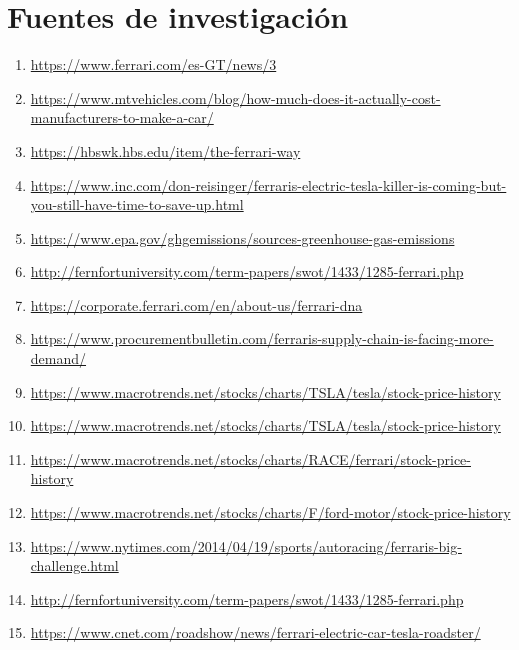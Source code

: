 \documentclass{article}
\begin{document}
\section{Fuentes de investigación}
\begin{enumerate} 
    \item \url{https://www.ferrari.com/es-GT/news/3}
    \item \url{https://www.mtvehicles.com/blog/how-much-does-it-actually-cost-manufacturers-to-make-a-car/} 
    \item \url{https://hbswk.hbs.edu/item/the-ferrari-way}
    \item \url{https://www.inc.com/don-reisinger/ferraris-electric-tesla-killer-is-coming-but-you-still-have-time-to-save-up.html}
    \item \url{https://www.epa.gov/ghgemissions/sources-greenhouse-gas-emissions}
    \item \url{http://fernfortuniversity.com/term-papers/swot/1433/1285-ferrari.php}
    \item \url{https://corporate.ferrari.com/en/about-us/ferrari-dna}
    \item \url{https://www.procurementbulletin.com/ferraris-supply-chain-is-facing-more-demand/}
    \item \url{https://www.macrotrends.net/stocks/charts/TSLA/tesla/stock-price-history}
    \item \url{https://www.macrotrends.net/stocks/charts/TSLA/tesla/stock-price-history}
    \item \url{https://www.macrotrends.net/stocks/charts/RACE/ferrari/stock-price-history}
    \item \url{https://www.macrotrends.net/stocks/charts/F/ford-motor/stock-price-history}
    \item \url{https://www.nytimes.com/2014/04/19/sports/autoracing/ferraris-big-challenge.html}
    \item \url{http://fernfortuniversity.com/term-papers/swot/1433/1285-ferrari.php}
    \item \url{https://www.cnet.com/roadshow/news/ferrari-electric-car-tesla-roadster/}
\end{enumerate}















\end{document}
